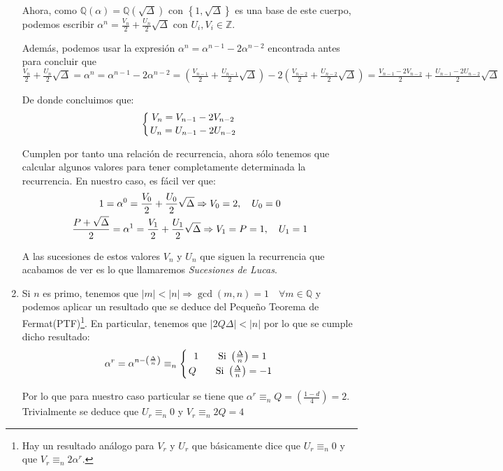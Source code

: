 \begin{enumerate}
		Ahora, como $\mathbb{Q\left(\alpha\right)} = \mathbb{Q\left(\sqrt{\Delta}\right)}$ con $\left\lbrace1,
		\sqrt{\Delta}\right\rbrace$ es una base de este cuerpo, podemos escribir $\displaystyle \alpha^n =
		\frac{V_n}{2} + \frac{U_n}{2}\sqrt{\Delta}$ con $U_i, V_i \in \mathbb{Z}$.
		
		Además, podemos usar la expresión $\alpha^n  = \alpha^{n-1} - 2\alpha^{n-2}$ encontrada antes para
		concluir que $\displaystyle \frac{V_n}{2} + \frac{U_n}{2}\sqrt{\Delta} = \alpha^n  = \alpha^{n-1} -
		2\alpha^{n-2} = \left(\frac{V_{n-1}}{2} + \frac{U_{n-1}}{2}\sqrt{\Delta}\right) -2\left(\frac{V_{n-2}}{2} +
		\frac{U_{n-2}}{2}\sqrt{\Delta}\right) = \frac{V_{n-1}-2V_{n-2}}{2} + \frac{U_{n-1}-2U_{n-2}}{2}\sqrt{\Delta}$
		
		De donde concluimos que:
		$$\left\lbrace
			V_n = V_{n-1}-2V_{n-2} \atop
			U_n = U_{n-1}-2U_{n-2}
		\right.$$
		
		Cumplen por tanto una relación de recurrencia, ahora sólo tenemos que calcular algunos valores para tener
		completamente determinada la recurrencia. En nuestro caso, es fácil ver que:
		$$\left.
			\displaystyle 1 = \alpha^0 = \frac{V_0}{2} + \frac{U_0}{2}\sqrt{\Delta} \Rightarrow V_0 = 2, \quad U_0 = 0 \atop
			\displaystyle \frac{P + \sqrt{\Delta}}{2} = \alpha^1 = \frac{V_1}{2} + \frac{U_1}{2}\sqrt{\Delta}\Rightarrow V_1 = P = 1, \quad U_1 = 1 
		\right.$$
		
		A las sucesiones de estos valores $V_n$ y $U_n$ que siguen la recurrencia que acabamos de ver es lo que
		llamaremos \textit{Sucesiones de Lucas}.
		
		\item Si $n$ es primo, tenemos que $\displaystyle |m| < |n| \Rightarrow \gcd(m, n) = 1 \quad \forall m \in
		\mathbb{Q}$ y podemos aplicar un resultado que se deduce del Pequeño Teorema de Fermat(PTF)\footnote{Hay un
		resultado análogo para $V_r$ y $U_r$ que básicamente dice que $U_r \equiv_n 0$ y que $V_r \equiv_n 2\alpha^r$.}.
		En particular, tenemos que $|2Q\Delta| < |n|$ por lo que se cumple dicho resultado:
		$$\alpha^r = \alpha^{n-\left(\frac{\Delta}{n}\right)} \equiv_n \left\lbrace
			1 \qquad \text{Si } \left(\frac{\Delta}{n}\right) = 1 \atop
			Q \qquad \text{Si } \left(\frac{\Delta}{n}\right) = -1
		\right.$$
		
		Por lo que para nuestro caso particular se tiene que $\displaystyle \alpha^r \equiv_n Q = \left(\frac{1-d}
		{4}\right) = 2$. Trivialmente se deduce que $U_r \equiv_n 0$ y $V_r \equiv_n 2Q = 4$
		

\end{enumerate}
